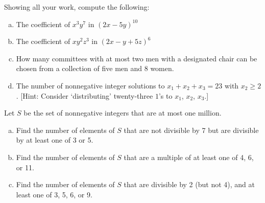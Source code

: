 \documentclass[12pt,letterpaper]{exam}
\begin{document}
\begin{questions}
\newpage
\question[10] Showing all your work, compute the following:
	\begin{enumerate}[(a)]
	\item The coefficient of $x^3y^7$ in $(2x - 5y)^{10}$
	\item The coefficient of $xy^2z^3$ in $(2x - y + 5z)^6$
	\item How many committees with at most two men with a designated chair can be chosen from a collection of five men and 8 women. 
	\item The number of nonnegative integer solutions to $x_1 + x_2 + x_3= 23$ with $x_2 \geq 2$. [Hint: Consider `distributing' twenty-three $1$'s to $x_1$, $x_2$, $x_3$.]
	\end{enumerate}



\newpage
\question[10] Let $S$ be the set of nonnegative integers that are at most one million. 
	\begin{enumerate}[(a)]
	\item Find the number of elements of $S$ that are not divisible by 7 but are divisible by at least one of 3 or 5. 	
	\item Find the number of elements of $S$ that are a multiple of at least one of 4, 6, or 11.
	\item Find the number of elements of $S$ that are divisible by 2 (but not 4), and at least one of 3, 5, 6, or 9.
	\end{enumerate}


\end{questions}
\end{document}
